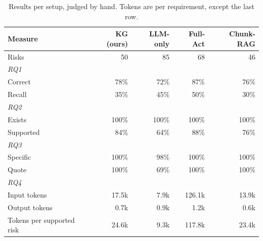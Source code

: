 \begin{table}[t]
\centering
\footnotesize
\setlength{\tabcolsep}{4pt}
\caption{Results per setup, judged by hand. Tokens are per requirement, except the last row.}
\label{tab:results}
\begin{tabular}{lrrrr}
\hline
Measure & KG (ours) & LLM-only & Full-Act & Chunk-RAG \\
\hline
Risks & 50 & 85 & 68 & 46 \\
\multicolumn{5}{l}{\textit{RQ1}} \\
\quad Correct & 78\% & 72\% & 87\% & 76\% \\
\quad Recall & 35\% & 45\% & 50\% & 30\% \\
\multicolumn{5}{l}{\textit{RQ2}} \\
\quad Exists & 100\% & 100\% & 100\% & 100\% \\
\quad Supported & 84\% & 64\% & 88\% & 76\% \\
\multicolumn{5}{l}{\textit{RQ3}} \\
\quad Specific & 100\% & 98\% & 100\% & 100\% \\
\quad Quote & 100\% & 69\% & 100\% & 100\% \\
\multicolumn{5}{l}{\textit{RQ4}} \\
\quad Input tokens & 17.5k & 7.9k & 126.1k & 13.9k \\
\quad Output tokens & 0.7k & 0.9k & 1.2k & 0.6k \\
\quad Tokens per supported risk & 24.6k & 9.3k & 117.8k & 23.4k \\
\hline
\end{tabular}
\end{table}
